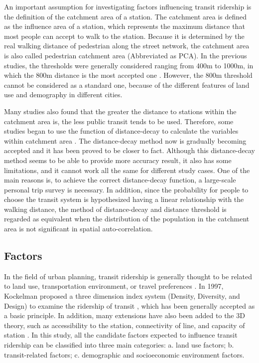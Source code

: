 \documentclass[utf8]{article}
\begin{document}
An important assumption for investigating factors influencing transit ridership is the definition of the catchment area of a station. The catchment area is defined as the influence area of a station, which represents the maximum distance that most people can accept to walk to the station. Because it is determined by the real walking distance of pedestrian along the street network, the catchment area is also called pedestrian catchment area (Abbreviated as PCA). In the previous studies, the thresholds were generally considered ranging from 400m to 1000m, in which the 800m distance is the most accepted one \cite{Alshalalfah2007,Guerra2012,Keijer2000,Murray1998,OSullivan1996,Zhao2003}. However, the 800m threshold cannot be considered as a standard one, because of the different features of land use and demography in different cities.

%
Many studies also found that the greater the distance to stations within the catchment area is, the less public transit tends to be used. Therefore, some studies began to use the function of distance-decay to calculate the variables within catchment area \cite{Gutierrez2011}. The distance-decay method now is gradually becoming accepted and it has been proved to be closer to fact. Although this distance-decay method seems to be able to provide more accuracy result, it also has some limitations, and it cannot work all the same for different study cases. One of the main reasons is, to achieve the correct distance-decay function, a large-scale personal trip survey is necessary. In addition, since the probability for people to choose the transit system is hypothesized having a linear relationship with the walking distance, the method of distance-decay and distance threshold is regarded as equivalent when the distribution of the population in the catchment area is not significant in spatial auto-correlation.

%
\subsection{Factors}
\indent

In the field of urban planning, transit ridership is generally thought to be related to land use, transportation environment, or travel preferences \cite{thompson1997achieving}. In 1997, Kockelman proposed a three dimension index system (Density, Diversity, and Design) to examine the ridership of transit \cite{Cervero1997}, which has been generally accepted as a basic principle. In addition, many extensions have also been added to the 3D theory, such as accessibility to the station, connectivity of line, and capacity of station \cite{Beimborn2003,Garcia-Palomares2013}. In this study, all the candidate factors expected to influence transit ridership can be classified into three main categories: a. land use factors; b. transit-related factors; c. demographic and socioeconomic environment factors.
\end{document}
